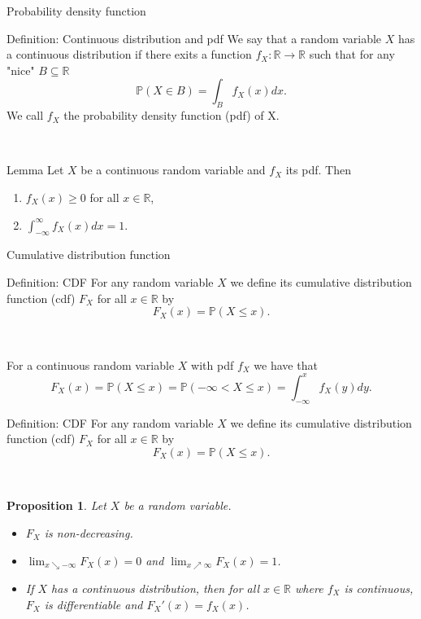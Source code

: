 \documentclass[11pt,pdf,ngerman,UKenglish]{beamer}%
\newcommand{\IR}{\mathds{R}}
\newcommand{\IP}{\mathbb{P}}
\newcommand{\1}{\mathbb{1}}
\theoremstyle{thm}
\newtheorem{proposition}[theorem]{Proposition}
\theoremstyle{def}
\begin{document}
\begin{frame}{Probability density function}
\begin{block}{Definition: Continuous distribution and pdf}
We say that a random variable $X$ has a continuous distribution if there exits a function $f_X: \IR \to \IR$ such that for any "nice" $B \subseteq \IR$
$$\IP(X \in B) = \int_B f_X(x) dx.$$
We call $f_X$ the probability density function (pdf) of X.
\end{block}
\
\begin{block}{Lemma}
Let $X$ be a continuous random variable and $f_X$ its pdf. Then
\begin{enumerate}
\item $f_X(x) \geq 0$ for all $x\in \IR$,
\item $\int_{-\infty}^\infty f_X(x) dx = 1$.
\end{enumerate}
\end{block}
\end{frame}


\begin{frame}{Cumulative distribution function}
\begin{block}{Definition: CDF}
For any random variable $X$ we define its cumulative distribution function (cdf) $F_X$ for all $x \in \IR$ by
$$ F_X(x) = \IP(X \leq x).$$
\end{block}
\
\begin{corollary}
For a continuous random variable $X$ with pdf $f_X$ we have that
$$ F_X(x) = \IP( X \leq x) = \IP( -\infty < X \leq x) = \int_{-\infty}^x f_X(y) dy.$$
\end{corollary}

\end{frame}


\begin{frame}
\begin{block}{Definition: CDF}
For any random variable $X$ we define its cumulative distribution function (cdf) $F_X$ for all $x \in \IR$ by
$$ F_X(x) = \IP(X \leq x).$$
\end{block}
\
\begin{proposition}
Let $X$ be a random variable.
\begin{itemize}
\item $F_X$ is non-decreasing.
\item $\lim_{x \searrow -\infty} F_X(x) = 0$ and $\lim_{x \nearrow \infty} F_X(x) = 1$.
\item If $X$ has a continuous distribution, then for all $x \in \IR$ where $f_X$ is continuous, $F_X$ is differentiable and $F_X'(x)=f_X(x)$.
\end{itemize}
\end{proposition}
\end{frame}
\end{document}

